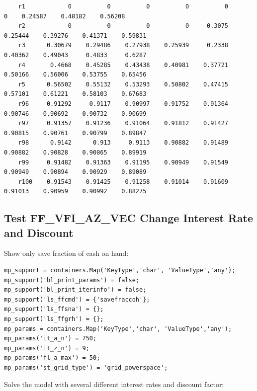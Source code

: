 \documentclass[
]{book}
\begin{document}
\begin{verbatim}
    r1            0          0          0          0          0          0    0.24587    0.48182    0.56208
    r2            0          0          0          0     0.3075    0.25444    0.39276    0.41371    0.59831
    r3      0.30679    0.29486    0.27938    0.25939     0.2338    0.40362    0.49043     0.4833     0.6287
    r4       0.4668    0.45285    0.43438    0.40981    0.37721    0.50166    0.56006    0.53755    0.65456
    r5      0.56502    0.55132    0.53293    0.50802    0.47415    0.57101    0.61221    0.58103    0.67683
    r96     0.91292     0.9117    0.90997    0.91752    0.91364    0.90746    0.90692    0.90732    0.90699
    r97     0.91357    0.91236    0.91064    0.91812    0.91427    0.90815    0.90761    0.90799    0.89847
    r98      0.9142      0.913     0.9113    0.90882    0.91489    0.90882    0.90828    0.90865    0.89919
    r99     0.91482    0.91363    0.91195    0.90949    0.91549    0.90949    0.90894    0.90929    0.89089
    r100    0.91543    0.91425    0.91258    0.91014    0.91609    0.91013    0.90959    0.90992    0.88275
\end{verbatim}

\hypertarget{test-ff_vfi_az_vec-change-interest-rate-and-discount}{%
\subsection{Test FF\_VFI\_AZ\_VEC Change Interest Rate and Discount}\label{test-ff_vfi_az_vec-change-interest-rate-and-discount}}

Show only save fraction of cash on hand:

\begin{verbatim}
mp_support = containers.Map('KeyType','char', 'ValueType','any');
mp_support('bl_print_params') = false;
mp_support('bl_print_iterinfo') = false;
mp_support('ls_ffcmd') = {'savefraccoh'};
mp_support('ls_ffsna') = {};
mp_support('ls_ffgrh') = {};
mp_params = containers.Map('KeyType','char', 'ValueType','any');
mp_params('it_a_n') = 750;
mp_params('it_z_n') = 9;
mp_params('fl_a_max') = 50;
mp_params('st_grid_type') = 'grid_powerspace';
\end{verbatim}

Solve the model with several different interest rates and discount
factor:
\end{document}
